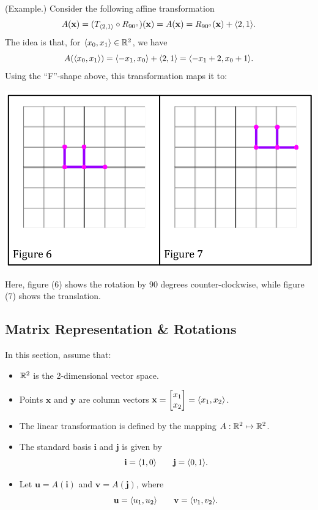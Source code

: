 \documentclass[letterpaper]{article}
\begin{document}
\begin{mdframed}[]
    (Example.) Consider the following affine transformation
    \[A(\mathbf{x}) = (T_{\langle 2, 1 \rangle} \circ R_{90^{\circ}})(\mathbf{x}) = A(\mathbf{x}) = R_{90^{\circ}}(\mathbf{x}) + \langle 2, 1 \rangle.\]
    The idea is that, for $\langle x_0, x_1 \rangle \in \mathbb{R}^2$, we have
    \[A(\langle x_0, x_1 \rangle) = \langle -x_1, x_0 \rangle + \langle 2, 1 \rangle = \langle -x_1 + 2, x_0 + 1 \rangle.\]
    Using the ``F''-shape above, this transformation maps it to: 
    \begin{center}
        \includegraphics[scale=0.3]{../assets/f5.png}
    \end{center}
    Here, figure (6) shows the rotation by 90 degrees counter-clockwise, while figure (7) shows the translation. 
\end{mdframed}


\subsection{Matrix Representation \& Rotations}
In this section, assume that: 
\begin{itemize}
    \item $\mathbb{R}^2$ is the 2-dimensional vector space.
    \item Points $\mathbf{x}$ and $\mathbf{y}$ are column vectors $\mathbf{x} = \begin{bmatrix}
        x_1 \\ x_2
    \end{bmatrix} = \langle x_1, x_2 \rangle$. 
    \item The linear transformation is defined by the mapping $A: \mathbb{R}^2 \mapsto \mathbb{R}^2$. 
    \item The standard basis $\mathbf{i}$ and $\mathbf{j}$ is given by 
    \[\mathbf{i} = \langle 1, 0 \rangle \qquad \mathbf{j} = \langle 0, 1 \rangle.\]
    \item Let $\mathbf{u} = A(\mathbf{i})$ and $\mathbf{v} = A(\mathbf{j})$, where 
    \[\mathbf{u} = \langle u_1, u_2 \rangle \qquad \mathbf{v} = \langle v_1, v_2 \rangle.\]
\end{itemize}
\end{document}
